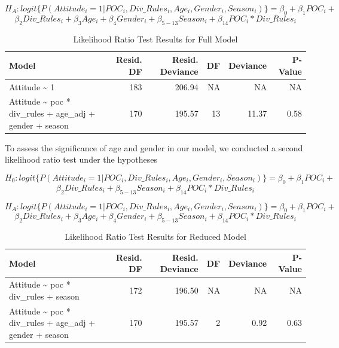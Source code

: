 \documentclass[
  letterpaper,
  DIV=11,
  numbers=noendperiod,
  oneside]{scrartcl}
\begin{document}
\[H_A: logit \{P(Attitude_i=1|POC_i,Div\_Rules_i,Age_i,Gender_i,Season_i)\} = \beta_0 + \beta_1POC_i + \]
\[\beta_2Div\_Rules_i + \beta_3Age_i+ \beta_4Gender_i + \beta_{5-13}Season_i + \beta_{14}POC_i*Div\_Rules_i\]

\hypertarget{tbl-full-anova}{}
\begin{table}

\begin{table}
\caption{\label{tbl-full-anova}Likelihood Ratio Test Results for Full Model }\tabularnewline

\centering
\begin{tabular}{l|r|r|r|r|r}
\hline
Model & Resid. DF & Resid. Deviance & DF & Deviance & P-Value\\
\hline
Attitude \textasciitilde{} 1 & 183 & 206.94 & NA & NA & NA\\
\hline
Attitude \textasciitilde{} poc * div\_rules + age\_adj + gender + season & 170 & 195.57 & 13 & 11.37 & 0.58\\
\hline
\end{tabular}
\end{table}

\end{table}

To assess the significance of age and gender in our model, we conducted
a second likelihood ratio test under the hypotheses

\[H_0: logit \{P(Attitude_i=1|POC_i,Div\_Rules_i,Age_i,Gender_i,Season_i)\} = \beta_0 + \beta_1POC_i + \]
\[\beta_2Div\_Rules_i + \beta_{5-13}Season_i + \beta_{14}POC_i*Div\_Rules_i\]

\[H_A: logit \{P(Attitude_i=1|POC_i,Div\_Rules_i,Age_i,Gender_i,Season_i)\} = \beta_0 + \beta_1POC_i + \]
\[\beta_2Div\_Rules_i + \beta_3Age_i+ \beta_4Gender_i + \beta_{5-13}Season_i + \beta_{14}POC_i*Div\_Rules_i\]

\hypertarget{tbl-reduced-anova}{}
\begin{table}

\begin{table}
\caption{\label{tbl-reduced-anova}Likelihood Ratio Test Results for Reduced Model }\tabularnewline

\centering
\begin{tabular}{l|r|r|r|r|r}
\hline
Model & Resid. DF & Resid. Deviance & DF & Deviance & P-Value\\
\hline
Attitude \textasciitilde{} poc * div\_rules + season & 172 & 196.50 & NA & NA & NA\\
\hline
Attitude \textasciitilde{} poc * div\_rules + age\_adj + gender + season & 170 & 195.57 & 2 & 0.92 & 0.63\\
\hline
\end{tabular}
\end{table}

\end{table}
\end{document}
